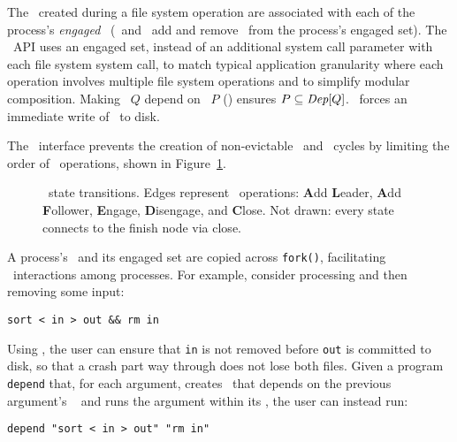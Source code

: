 The \chdescs\ created during a file system operation are associated
with each of the process's \emph{engaged} \opgroups\ (\opgroupEngage\
and \opgroupDisengage\ add and remove \anopgroup\ from the process's
engaged set).
%
The \opgroup\ API uses an engaged set, instead of an additional system
call parameter with each file system system call, to match typical
application granularity where each operation involves multiple file
system operations and to simplify modular composition.
%
Making \opgroup\ $Q$ depend on \opgroup\ $P$ (\opgroupAddDepend)
ensures \(P \subseteq \textit{Dep}[Q]\).
%
\opgroupSync\ forces an immediate write of \anopgroup\ to disk.

The \opgroup\ interface prevents the creation of non-evictable
\chdescs\ and \chdesc\ cycles by limiting the order of \opgroup\
operations, shown in Figure~\ref{fig:opgroup-transitions-states}.

\begin{figure}[htb]
\vspace{-0.5\baselineskip}
\vspace{-0.5\baselineskip}
\caption{\label{fig:opgroup-transitions-states} \Opgroup\ state
  transitions. Edges represent \opgroup\ operations: \textbf{A}dd
  \textbf{L}eader, \textbf{A}dd \textbf{F}ollower,
  \textbf{E}ngage, \textbf{D}isengage, and \textbf{C}lose.
  Not drawn: every state connects to the finish node via close.}
\end{figure}

A process's \opgroups\ and its engaged set are copied across \texttt{fork()},
facilitating \opgroup\ interactions among processes.
%
For example, consider processing and then removing some input:
%
\vspace{-0.5\baselineskip}
\begin{center}
\begin{small}
\verb+sort < in > out && rm in+
\end{small}
\end{center}
\vspace{-0.5\baselineskip}
%
Using \opgroups, the user can ensure that \texttt{in} is not removed
before \texttt{out} is committed to disk, so that a crash part way
through does not lose both files.
%
Given a program \texttt{depend} that, for each argument,
%
creates \anopgroup\ that depends on the previous argument's \opgroup\
%
and runs the argument within its \opgroup,
%
the user can instead run:
%
\vspace{-0.5\baselineskip}
\begin{center}
\begin{small}
\verb+depend "sort < in > out" "rm in"+
\end{small}
\end{center}
\vspace{-0.5\baselineskip}

